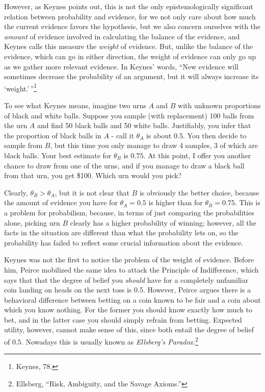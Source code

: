 However, as Keynes points out, this is not the only epistemologically
significant relation between probability and evidence, for we not only
care about how much the current evidence favors the hypothesis, but we
also concern ourselves with the \emph{amount} of evidence involved in
calculating the balance of the evidence, and Keynes calls this measure
the \emph{weight} of evidence. But, unlike the balance of the evidence,
which can go in either direction, the weight of evidence can only go up as
we gather more relevant evidence. In Keynes' words, ``New evidence will
sometimes decrease the probability of an argument, but it will always
increase its `weight.'\,''\footnote{Keynes, 78.}

To see what Keynes means, imagine two urns \(A\) and \(B\) with unknown
proportions of black and white balls. Suppose you sample (with
replacement) 100 balls from the urn \(A\) and find 50 black balls and 50
white balls. Justifiably, you infer that the proportion of black balls
in \(A\) - call it \(\theta_A\) is about \(0.5\). You then decide to
sample from \(B\), but this time you only manage to draw 4 samples, 3 of
which are black balls. Your best estimate for \(\theta_B\) is \(0.75\).
At this point, I offer you another chance to draw from one of the urns,
and if you manage to draw a black ball from that urn, you get \$100.
Which urn would you pick?

Clearly, \(\theta_B > \theta_A\), but it is not clear that \(B\) is
obviously the better choice, because the amount of evidence you have for
\(\theta_A = 0.5\) is higher than for \(\theta_B = 0.75\). This is a
problem for probabilism, because, in terms of just comparing the
probabilities alone, picking urn \(B\) clearly has a higher probability
of winning; however, all the facts in the situation are different than
what the probability lets on, so the probability has failed to reflect
some crucial information about the evidence.

Keynes was not the first to notice the problem of the weight of
evidence. Before him, Peirce mobilized the same idea to attack the Principle of Indifference, which says that that the degree of belief you \emph{should} have for a completely unfamiliar coin landing on heads on the next toss is 0.5. However,
Peirce argues there is a behavioral difference between betting on a coin known to be fair and a coin about which you know nothing. For the former you should know exactly how
much to bet, and in the latter case you should simply refrain from betting.
Expected utility, however, cannot make sense of this, since both
entail the degree of belief of \(0.5\). Nowadays this is usually known
as \emph{Ellsberg's Paradox}.\footnote{Ellsberg, ``Risk, Ambiguity,
  and the Savage Axioms.''}

